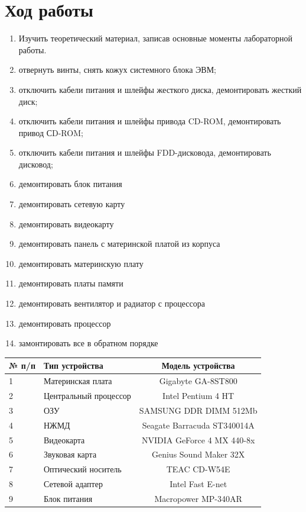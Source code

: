 \documentclass[a4paper]{article}
\begin{document}
\section{Ход работы}
\begin{enumerate}
    \item Изучить теоретический материал, записав основные моменты лабораторной работы.
    \item отвернуть винты, снять кожух системного блока ЭВМ; 
    \item отключить кабели питания и шлейфы жесткого диска, демонтировать жесткий диск;
    \item отключить кабели питания и шлейфы привода CD-ROM, демонтировать привод СD-ROM;
    \item отключить кабели питания и шлейфы FDD-дисковода, демонтировать дисковод;
    \item демонтировать блок питания
    \item демонтировать сетевую карту
    \item демонтировать видеокарту
    \item демонтировать панель с материнской платой из корпуса
    \item демонтировать материнскую плату
    \item демонтировать платы памяти
    \item демонтировать вентилятор и радиатор с процессора
    \item демонтировать процессор
    \item замонтировать все в обратном порядке
\end{enumerate}

\begin{table}[ht]
\centering
\begin{tabular}{|l|l|c|}
\hline
№ п/п & Тип устройства & Модель устройства\\
\hline
1 & Материнская плата & Gigabyte GA-8ST800 \\
2 & Центральный процессор & Intel Pentium 4 HT\\
3 & ОЗУ & SAMSUNG DDR DIMM 512Mb\\
4 & НЖМД & Seagate Barracuda ST340014A \\ 
5 & Видеокарта & NVIDIA GeForce 4 MX 440-8x \\
6 & Звуковая карта & Genius Sound Maker 32X \\
7 & Оптический носитель & TEAC CD-W54E \\ 
8 & Сетевой адаптер & Intel Fast E-net\\
9 & Блок питания & Macropower MP-340AR\\
\hline
\end{tabular}
\end{table}
\end{document}
